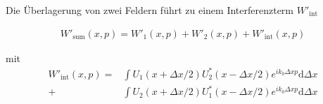 \documentclass{article}
\begin{document}
Die \"Uberlagerung von zwei Feldern f\"uhrt zu einem Interferenzterm
$W'_\textrm{int}$

\begin{align}
  W'_\textrm{sum}(x,p) = W'_1(x,p) + W'_2(x,p) + W'_\textrm{int} (x,p)
\end{align}

mit 
\begin{align}
  W'_\textrm{int} (x,p) = 
  &\int U_1(x+\Delta x/2)  U^*_2(x-\Delta x/2) e^{i k_0 \Delta x p} \textrm{d} \Delta x \\
  + &\int U_2(x+\Delta x/2)  U^*_1(x-\Delta x/2) e^{i k_0 \Delta x p} \textrm{d} \Delta x
\end{align}
\end{document}
